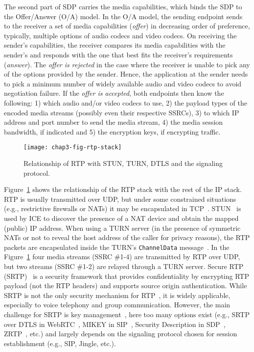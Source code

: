 The second part of SDP carries the media capabilities, which binds the SDP to
the Offer/Answer (O/A) model. In the O/A model, the sending endpoint sends to
the receiver a set of media capabilities (\emph{offer}) in decreasing order of
preference, typically, multiple options of audio codecs and video codecs. On
receiving the sender's capabilities, the receiver compares its media
capabilities with the sender's and responds with the one that best fits the
receiver's requirements (\emph{answer}). The \emph{offer is rejected} in the
case where the receiver is unable to pick any of the options provided by the
sender. Hence, the application at the sender needs to pick a minimum number of
widely available audio and video codecs to avoid negotiation failure. If the
\emph{offer is accepted}, both endpoints then know the following: 1) which
audio and/or video codecs to use, 2) the payload types of the encoded media
streams (possibly even their respective SSRCs), 3) to which IP address and
port number to send the media stream, 4) the media session bandwidth, if
indicated and 5) the encryption keys, if encrypting traffic.

\begin{figure}
\texttt{[image: chap3-fig-rtp-stack]}
\caption{Relationship of RTP with STUN, TURN, DTLS and the signaling protocol.}
\label{fig:3:rtp-stack}
\end{figure}

Figure~\ref{fig:3:rtp-stack} shows the relationship of the RTP stack with the
rest of the IP stack. RTP is usually transmitted over UDP, but under some
constrained situations (e.g., restrictive firewalls or NATs) it may be
encapsulated in TCP~\cite{rfc3550}. STUN~\cite{rfc5389} is used by ICE to
discover the presence of a NAT device and obtain the mapped (public) IP
address. When using a TURN server (in the presence of symmetric NATs or not to
reveal the host address of the caller for privacy reasons), the RTP packets
are encapsulated inside the TURN's \texttt{ChannelData}
message~\cite{rfc5766}. In the Figure~\ref{fig:3:rtp-stack} four media streams
(SSRC \#1-4) are transmitted by RTP over UDP, but two streams (SSRC \#1-2) are
relayed through a TURN server. Secure RTP (SRTP)~\cite{rfc3611} is a security
framework that provides confidentiality by encrypting RTP payload (not the RTP
headers) and supports source origin authentication. While SRTP is not the only
security mechanism for RTP~\cite{draft.srtp-not-must}, it is widely
applicable, especially to voice telephony and group communication. However,
the main challenge for SRTP is key management~\cite{draft.sec-opts}, here too
many options exist (e.g., SRTP over DTLS in WebRTC~\cite{rfc5763}, MIKEY in
SIP~\cite{rfc3830}, Security Description in SDP~\cite{rfc4566},
ZRTP~\cite{RFC6189}, etc.) and largely depends on the signaling protocol
chosen for session establishment (e.g., SIP, Jingle, etc.).